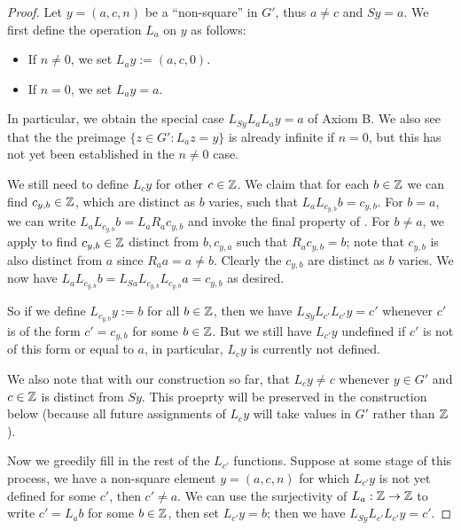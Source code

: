 \begin{proof}  Let $y = (a,c,n)$ be a ``non-square'' in $G'$, thus $a \neq c$ and $Sy = a$.  We first define the operation $L_a$ on $y$ as follows:
\begin{itemize}
  \item If $n \neq 0$, we set $L_a y := (a,c,0)$.
  \item If $n=0$, we set $L_a y = a$.
\end{itemize}
In particular, we obtain the special case $L_{Sy} L_a L_a y = a$ of Axiom B.  We also see that the the preimage $\{ z \in G': L_a z = y \}$ is already infinite if $n = 0$, but this has not yet been established in the $n \neq 0$ case.

We still need to define $L_c y$ for other $c \in \mathbb{Z}$.  We claim that for each $b \in \mathbb{Z}$ we can find $c_{y,b} \in \mathbb{Z}$, which are distinct as $b$ varies, such that
$L_a L_{c_{y,b}} b = c_{y,b}$.  For $b=a$, we can write $L_a L_{c_{y,b}} b = L_a R_a c_{y,b}$ and invoke the final property of .  For $b \neq a$, we apply  to find $c_{y,b} \in \mathbb{Z}$ distinct from $b, c_{y,a}$ such that $R_a c_{y,b} = b$; note that $c_{y,b}$ is also distinct from $a$ since $R_a a = a \neq b$.  Clearly the $c_{y,b}$ are distinct as $b$ varies.  We now have $L_a L_{c_{y,b}} b = L_{Sa} L_{c_{y,b}} L_{c_{y,b}} a = c_{y,b}$ as desired.

So if we define $L_{c_{y,b}} y := b$ for all $b \in \mathbb{Z}$, then we have $L_{Sy} L_{c'} L_{c'} y = c'$ whenever $c'$ is of the form $c' = c_{y,b}$ for some $b \in \mathbb{Z}$.  But we still have $L_{c'} y$ undefined if $c'$ is not of this form or equal to $a$, in particular, $L_c y$ is currently not defined.

We also note that with our construction so far, that $L_c y \neq c$ whenever $y \in G'$ and $c \in \mathbb{Z}$ is distinct from $Sy$.  This proeprty will be preserved in the construction below (because all future assignments of $L_c y$ will take values in $G'$ rather than $\mathbb{Z}$).

Now we greedily fill in the rest of the $L_{c'}$ functions.  Suppose at some stage of this process, we have a non-square element $y = (a,c,n)$ for which $L_{c'} y$ is not yet defined for some $c'$, then $c' \neq a$. We can use the surjectivity of $L_a: \mathbb{Z} \to \mathbb{Z}$ to write $c' = L_a b$ for some $b \in \mathbb{Z}$, then set $L_{c'} y = b$; then we have $L_{Sy} L_{c'} L_{c'} y = c'$.


\end{proof}
